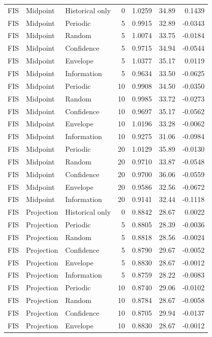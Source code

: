 \begin{longtable}{lllrrrr}
FIS & Midpoint & Historical only & 0 & 1.0259 & 34.89 & 0.1439 \\
FIS & Midpoint & Periodic & 5 & 0.9915 & 32.89 & -0.0343 \\
FIS & Midpoint & Random & 5 & 1.0074 & 33.75 & -0.0184 \\
FIS & Midpoint & Confidence & 5 & 0.9715 & 34.94 & -0.0544 \\
FIS & Midpoint & Envelope & 5 & 1.0377 & 35.17 & 0.0119 \\
FIS & Midpoint & Information & 5 & 0.9634 & 33.50 & -0.0625 \\
FIS & Midpoint & Periodic & 10 & 0.9908 & 34.50 & -0.0350 \\
FIS & Midpoint & Random & 10 & 0.9985 & 33.72 & -0.0273 \\
FIS & Midpoint & Confidence & 10 & 0.9697 & 35.17 & -0.0562 \\
FIS & Midpoint & Envelope & 10 & 1.0196 & 33.28 & -0.0062 \\
FIS & Midpoint & Information & 10 & 0.9275 & 31.06 & -0.0984 \\
FIS & Midpoint & Periodic & 20 & 1.0129 & 35.89 & -0.0130 \\
FIS & Midpoint & Random & 20 & 0.9710 & 33.87 & -0.0548 \\
FIS & Midpoint & Confidence & 20 & 0.9700 & 36.06 & -0.0559 \\
FIS & Midpoint & Envelope & 20 & 0.9586 & 32.56 & -0.0672 \\
FIS & Midpoint & Information & 20 & 0.9141 & 32.44 & -0.1118 \\
FIS & Projection & Historical only & 0 & 0.8842 & 28.67 & 0.0022 \\
FIS & Projection & Periodic & 5 & 0.8805 & 28.39 & -0.0036 \\
FIS & Projection & Random & 5 & 0.8818 & 28.56 & -0.0024 \\
FIS & Projection & Confidence & 5 & 0.8790 & 29.67 & -0.0052 \\
FIS & Projection & Envelope & 5 & 0.8830 & 28.67 & -0.0012 \\
FIS & Projection & Information & 5 & 0.8759 & 28.22 & -0.0083 \\
FIS & Projection & Periodic & 10 & 0.8740 & 29.06 & -0.0102 \\
FIS & Projection & Random & 10 & 0.8784 & 28.67 & -0.0058 \\
FIS & Projection & Confidence & 10 & 0.8705 & 29.94 & -0.0137 \\
FIS & Projection & Envelope & 10 & 0.8830 & 28.67 & -0.0012 \\

\end{longtable}
